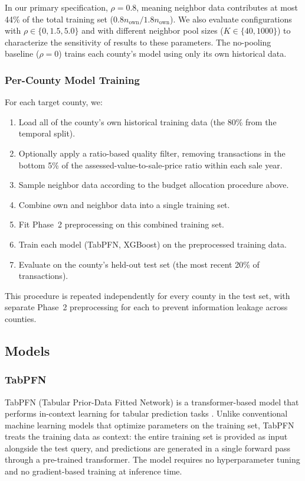 In our primary specification, $\rho = 0.8$, meaning neighbor data contributes at most 44\% of the total training set ($0.8n_{\text{own}} / 1.8n_{\text{own}}$). We also evaluate configurations with $\rho \in \{0, 1.5, 5.0\}$ and with different neighbor pool sizes ($K \in \{40, 1000\}$) to characterize the sensitivity of results to these parameters. The no-pooling baseline ($\rho = 0$) trains each county's model using only its own historical data.

\subsubsection{Per-County Model Training}

For each target county, we:
\begin{enumerate}
    \item Load all of the county's own historical training data (the 80\% from the temporal split).
    \item Optionally apply a ratio-based quality filter, removing transactions in the bottom 5\% of the assessed-value-to-sale-price ratio within each sale year.
    \item Sample neighbor data according to the budget allocation procedure above.
    \item Combine own and neighbor data into a single training set.
    \item Fit Phase~2 preprocessing on this combined training set.
    \item Train each model (TabPFN, XGBoost) on the preprocessed training data.
    \item Evaluate on the county's held-out test set (the most recent 20\% of transactions).
\end{enumerate}

This procedure is repeated independently for every county in the test set, with separate Phase~2 preprocessing for each to prevent information leakage across counties.

\subsection{Models}\label{sec:models}

\subsubsection{TabPFN}

TabPFN (Tabular Prior-Data Fitted Network) is a transformer-based model that performs in-context learning for tabular prediction tasks \citep{hollmann2023tabpfn}. Unlike conventional machine learning models that optimize parameters on the training set, TabPFN treats the training data as context: the entire training set is provided as input alongside the test query, and predictions are generated in a single forward pass through a pre-trained transformer. The model requires no hyperparameter tuning and no gradient-based training at inference time.

